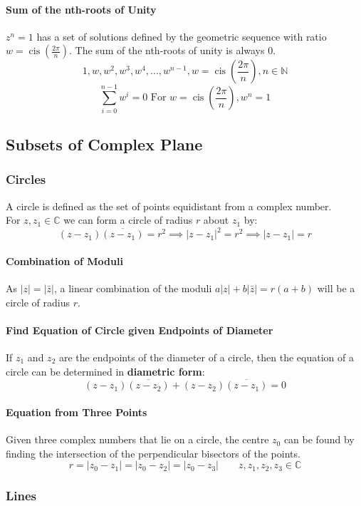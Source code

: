 \documentclass[a4paper,twoside,10pt]{article}
\DeclareMathOperator\cis{cis}
\begin{document}
			\paragraph{Sum of the nth-roots of Unity} $z^n=1$ has a set of solutions defined by the geometric sequence with ratio $w=\cis\left(\frac{2\pi}{n}\right)$. The sum of the nth-roots of unity is always 0.
			\[
				1,w,w^2,w^3,w^4,...,w^{n-1},w=\cis\left(\frac{2\pi}{n}\right),n\in\mathbb{N}
			\]
			\[
				\sum\limits_{i=0}^{n-1}w^i=0 \text{ For }w=\cis\left(\frac{2\pi}{n}\right),w^n=1
			\]
		\subsection{Subsets of Complex Plane}
			\subsubsection{Circles}
				A circle is defined as the set of points equidistant from a complex number.\\
				For $z,z_1\in\mathbb{C}$ we can form a circle of radius $r$ about $z_1$ by:
				\[
					\left(z-z_1\right)\overline{\left(z-z_1\right)}=r^2\implies |z-z_1|^2=r^2 \implies |z-z_1|=r
				\]
				\paragraph{Combination of Moduli} As $|z|=|\bar{z}|$, a linear combination of the moduli $a|z|+b|\bar{z}|=r(a+b)$ will be a circle of radius $r$.
				\paragraph{Find Equation of Circle given Endpoints of Diameter} If $z_1$ and $z_2$ are the endpoints of the diameter of a circle, then the equation of a circle can be determined in \textbf{diametric form}:
				\[
					(z-z_1)\overline{\left(z-z_2\right)}+(z-z_2)\overline{\left(z-z_1\right)}=0
				\]
				\paragraph{Equation from Three Points} Given three complex numbers that lie on a circle, the centre $z_0$ can be found by finding the intersection of the perpendicular bisectors of the points.
				\[
					r=|z_0-z_1|=|z_0-z_2|=|z_0-z_3|\qquad z,z_1,z_2,z_3\in\mathbb{C}
				\]
			\subsubsection{Lines}
\end{document}
